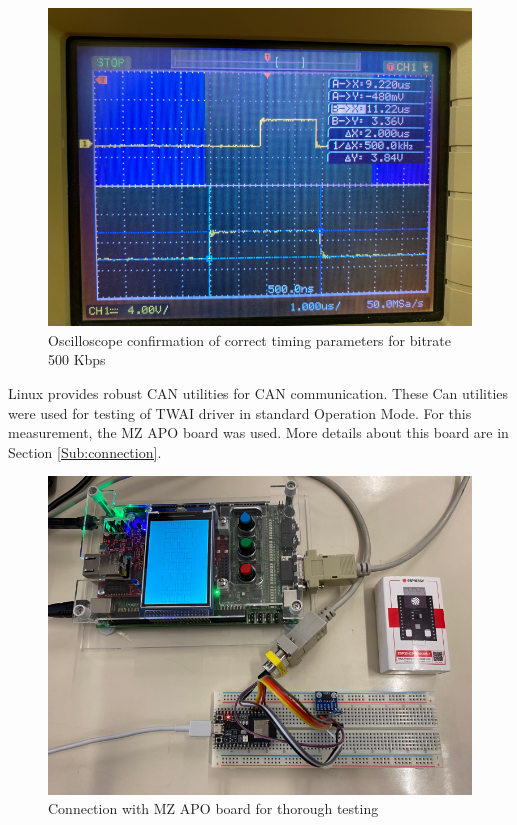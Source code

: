 \documentclass{ctuthesis}
\begin{document}
 \begin{figure}[htb]
 \includegraphics[width=1\textwidth]{images/500Kbps.pdf}
 \caption{Oscilloscope confirmation of correct timing parameters for bitrate 500 Kbps}
 \end{figure}

 Linux provides robust CAN utilities for CAN communication. These Can utilities were used for testing of TWAI driver in standard Operation Mode. For this measurement, the MZ APO board was used. More details about this board are in Section \ref{Sub:connection}.
 
 \clearpage
 \begin{figure}[htb]
 \includegraphics[width=1\textwidth]{images/mz_apo.pdf}
 \caption{Connection with MZ APO board for thorough testing}
 \end{figure}
\end{document}
